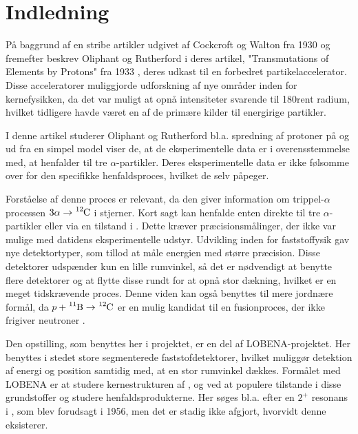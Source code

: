 \chapter{Indledning}
\label{cha:indledning}
\vspace{-0.5\onelineskip}

På baggrund af en stribe artikler udgivet af Cockcroft og Walton fra 1930 og fremefter \cite{Walton}
beskrev Oliphant og Rutherford i deres artikel, "Transmutations of Elements by Protons"{} fra 1933
\cite{Rutherford}, deres udkast til en forbedret partikelaccelerator. Disse acceleratorer muliggjorde
udforskning af nye områder inden for kernefysikken, da det var muligt at opnå intensiteter svarende
til 180\gram rent radium, hvilket tidligere havde været en af de primære kilder til energirige
partikler.

I denne artikel studerer Oliphant og Rutherford bl.a. spredning af protoner på \Bor og ud fra en
simpel model viser de, at de eksperimentelle data er i overensstemmelse med, at \Carb henfalder til
tre $\alpha$-partikler. Deres eksperimentelle data er ikke følsomme over for den specifikke
henfaldsproces, hvilket de selv påpeger. 

Forståelse af denne proces er relevant, da den giver information om trippel-$\alpha$ processen
$3\alpha\rightarrow\Carb$ i stjerner. Kort sagt kan \Carb henfalde enten direkte til tre $\alpha$-partikler
eller via en tilstand i \Be. Dette kræver præcisionsmålinger, der ikke var mulige med datidens
eksperimentelle udstyr. Udvikling inden for faststoffysik gav nye detektortyper, som tillod at måle
energien med større præcision. Disse detektorer udspænder kun en lille rumvinkel, så det er
nødvendigt at benytte flere detektorer og at flytte disse rundt for at opnå stor dækning, hvilket er
en meget tidskrævende proces. Denne viden kan også benyttes til mere jordnære formål, da
$p+\Bor \rightarrow \Carb$ er en mulig kandidat til en fusionproces, der ikke frigiver neutroner
\cite{becker}.

Den opstilling, som benyttes her i projektet, er en del af LOBENA-projektet. Her benyttes i stedet
store segmenterede faststofdetektorer, hvilket muliggør detektion af energi og position samtidig med,
at en stor rumvinkel dækkes. Formålet med LOBENA er at studere kernestrukturen af \Be, \Carb og
 ved at populere tilstande i disse grundstoffer og studere henfaldsprodukterne. Her søges
bl.a. efter en $2^{+}$ resonans i \Carb, som blev forudsagt i 1956, men det er stadig ikke afgjort,
hvorvidt denne eksisterer.

